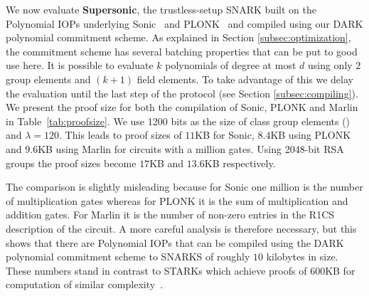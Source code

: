 We now evaluate \textsf{\textbf{Supersonic}}, the trustless-setup SNARK built on the Polynomial IOPs underlying \textsf{Sonic}~\cite{Sonic} and \textsf{PLONK}~\cite{Plonk} and compiled using our DARK polynomial commitment scheme. As explained in Section \ref{subsec:optimization}, the commitment scheme has several batching properties that can be put to good use here. It is possible to evaluate $k$ polynomials of degree at most $d$ using only $2$ group elements and $(k+1)$ field elements. To take advantage of this we delay the evaluation until the last step of the protocol (see Section \ref{subsec:compiling}). We present the proof size for both the compilation of \textsf{Sonic}, \textsf{PLONK} and \textsf{Marlin} in Table~\ref{tab:proofsize}. We use 1200 bits as the size of class group elements (\cite{PKC/BucHam01}) and $\lambda=120$. This leads to proof sizes of $11$KB for \textsf{Sonic}, $8.4$KB using \textsf{PLONK} and $9.6$KB using \textsf{Marlin} for circuits with a million gates. Using 2048-bit RSA groups the proof sizes become $17$KB and $13.6$KB respectively. 

The comparison is slightly misleading because for \textsf{Sonic} one million is the number of multiplication gates whereas for \textsf{PLONK} it is the sum of multiplication and addition gates. For \textsf{Marlin} it is the number of non-zero entries in the R1CS description of the circuit. A more careful analysis is therefore necessary, but this shows that there are Polynomial IOPs that can be compiled using the DARK polynomial commitment scheme to SNARKS of roughly $10$ kilobytes in size. These numbers stand in contrast to \textsf{STARK}s which achieve proofs of $600$KB for computation of similar complexity~\cite{C:BBHR19}. 
\vspace{-1em}

